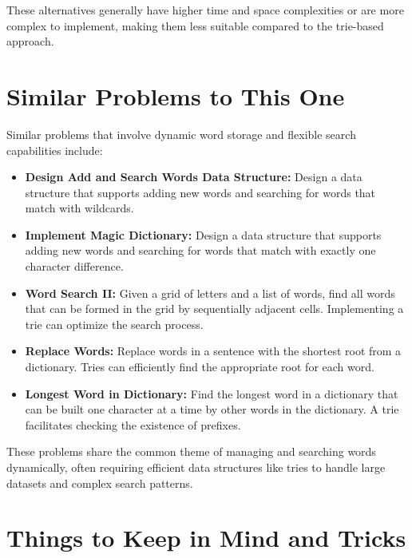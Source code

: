 These alternatives generally have higher time and space complexities or are more complex to implement, making them less suitable compared to the trie-based approach.

\section*{Similar Problems to This One}

Similar problems that involve dynamic word storage and flexible search capabilities include:

\begin{itemize}
    \item \textbf{Design Add and Search Words Data Structure:}  
    Design a data structure that supports adding new words and searching for words that match with wildcards.
    
    \item \textbf{Implement Magic Dictionary:}  
    Design a data structure that supports adding new words and searching for words that match with exactly one character difference.
    
    \item \textbf{Word Search II:}  
    Given a grid of letters and a list of words, find all words that can be formed in the grid by sequentially adjacent cells. Implementing a trie can optimize the search process.
    
    \item \textbf{Replace Words:}  
    Replace words in a sentence with the shortest root from a dictionary. Tries can efficiently find the appropriate root for each word.
    
    \item \textbf{Longest Word in Dictionary:}  
    Find the longest word in a dictionary that can be built one character at a time by other words in the dictionary. A trie facilitates checking the existence of prefixes.
\end{itemize}

These problems share the common theme of managing and searching words dynamically, often requiring efficient data structures like tries to handle large datasets and complex search patterns.

\section*{Things to Keep in Mind and Tricks}

